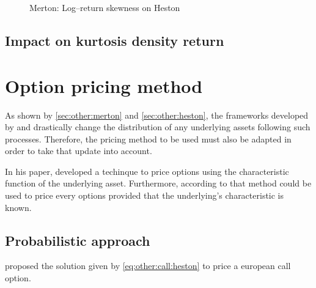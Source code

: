 \documentclass[12pt]{report}
\begin{document}
\begin{figure}[H]
\centering

\caption{Merton: Log--return skewness on Heston}
\label{plot:hestontails}
\end{figure}

\subsection{Impact on kurtosis density return}
\label{sub:hestonkurtosis}



\section{Option pricing method}
\label{sec:other:option}

As shown by \cref{sec:other:merton} and \cref{sec:other:heston}, the frameworks developed by \citet{merton76} and \citet{heston1993} drastically change the distribution of any underlying assets following such processes. Therefore, the pricing method to be used must also be adapted in order to take that update into account.

In his paper, \citet{heston1993} developed a techinque to price options using the characteristic function of the underlying asset. Furthermore, according to \citet{criso2015} that method could be used to price every options provided that the underlying's characteristic  is known.

\subsection{Probabilistic approach}
\label{sub:other:option:probabilistic}

\citet{heston1993} proposed the solution given by \cref{eq:other:call:heston} to price a european call option.
\end{document}
